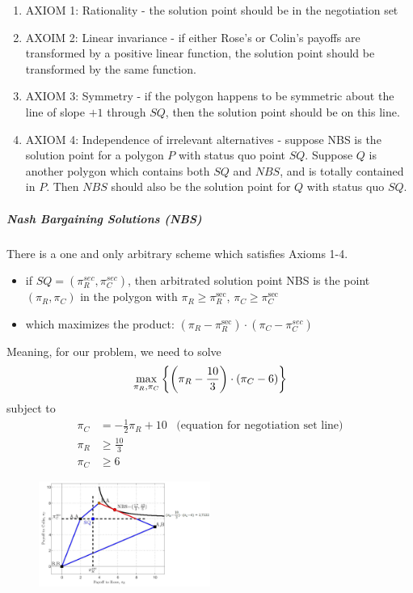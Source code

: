 \begin{enumerate}[]
    \item AXIOM 1: Rationality - the solution point should be in the negotiation set
    \item AXOIM 2: Linear invariance - if either Rose's or Colin's payoffs are transformed
        by a positive linear function, the solution point should be transformed by
        the same function.
    \item AXIOM 3: Symmetry - if the polygon happens to be symmetric about the line
        of slope $+1$ through $SQ$, then the solution point should be on this line.
    \item AXIOM 4: Independence of irrelevant alternatives - suppose NBS is the
        solution point for a polygon $P$ with status quo point $SQ$. Suppose $Q$
        is another polygon which contains both $SQ$ and $NBS$, and is totally
        contained in $P$. Then $NBS$ should also be the solution point for $Q$
        with status quo $SQ$.
\end{enumerate}

\subparagraph{Nash Bargaining Solutions (NBS)}

There is a one and only arbitrary scheme which satisfies Axioms 1-4.
\begin{itemize}
    \item if $SQ = (\pi_R^{sec},\pi_C^{sec})$, then arbitrated solution point
        NBS is the point $(\pi_R,\pi_C)$ in the polygon with $\pi_R \geq \pi_R^{\sec}$,
        $\pi_C \geq \pi_C^{\sec}$
    \item which maximizes the product: $(\pi_R - \pi_R^{\sec}) \cdot (\pi_C - \pi_C^{sec})$
\end{itemize}
Meaning, for our problem, we need to solve
\begin{align*}
    \max_{\pi_R , \pi_C} \left\{ \left( \pi_R - \frac{10}{3} \right) \cdot \left( \pi_C - 6 \right) \right\}
\end{align*}
subject to
\begin{align*}
    \pi_C &= - \frac{1}{2} \pi_R + 10 \hspace{10pt} \text{(equation for negotiation set line)}
    \\
    \pi_R &\geq \frac{10}{3}
    \\
    \pi_C &\geq 6
\end{align*}
\begin{figure}[H]
    \centering
    \includegraphics[width=0.5\textwidth]{Pictures/rose_colin_payoff_polygon_NBS.png}
\end{figure}


